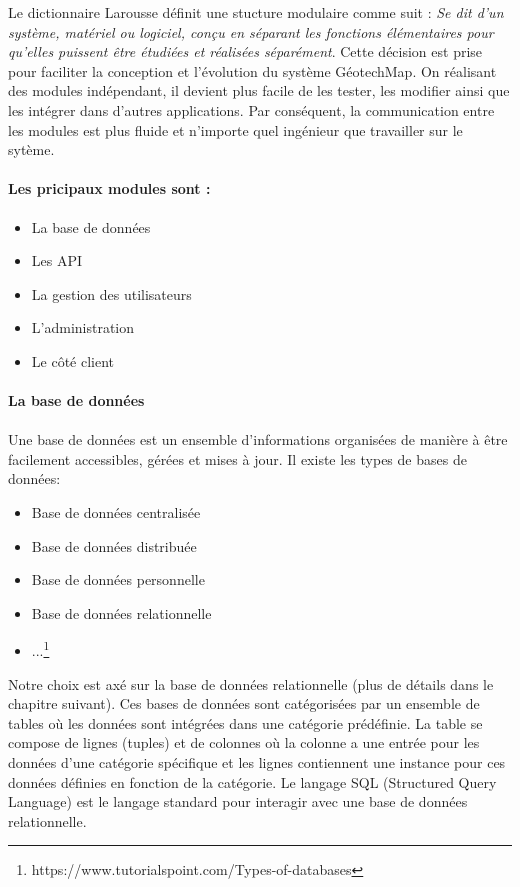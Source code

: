 Le dictionnaire Larousse définit une stucture modulaire comme suit : 
\textit{Se dit d'un système, matériel ou logiciel, conçu en séparant les 
fonctions élémentaires pour qu'elles puissent être étudiées et réalisées séparément}\cite{Larousse}. 
Cette décision est prise pour faciliter la conception et l'évolution du système GéotechMap.
On réalisant des modules indépendant, il devient plus facile de les tester, les modifier 
ainsi que les intégrer dans d'autres applications. Par conséquent, la communication entre les modules 
est plus fluide et n'importe quel ingénieur que travailler sur le sytème.
\paragraph{Les pricipaux modules sont :}
\begin{itemize}
        \item La base de données
        \item Les API
        \item La gestion des utilisateurs
        \item L'administration
        \item Le côté client
\end{itemize}
\paragraph{La base de données}
\paragraph{}
Une base de données est un ensemble d'informations organisées de manière 
à être facilement accessibles, gérées et mises à jour. Il existe les types de bases de données:
\begin{itemize}
        \item Base de données centralisée
        \item Base de données distribuée
        \item Base de données personnelle
        \item Base de données relationnelle
        \item ...\footnote{https://www.tutorialspoint.com/Types-of-databases}
\end{itemize}
Notre choix est axé sur la base de données relationnelle (plus de détails dans le chapitre suivant).
Ces bases de données sont catégorisées par un ensemble de tables où les données 
sont intégrées dans une catégorie prédéfinie. La table se compose de lignes (tuples)
et de colonnes où la colonne a une entrée pour les données d'une catégorie spécifique 
et les lignes contiennent une instance pour ces données définies en fonction de la catégorie. 
Le langage SQL (Structured Query Language) est le langage standard pour interagir avec
 une base de données relationnelle.
